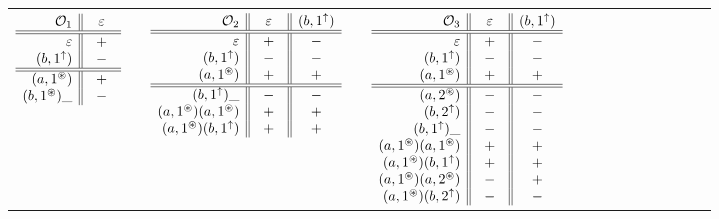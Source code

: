 \documentclass{LMCS}
\newcommand{\rreg}[1]{#1^\uparrow}
\newcommand{\gfresh}[1]{#1^\circledast}
\begin{document}
\begin{figure}[ht]
\begin{center}
{\footnotesize
\noindent
\begin{tabular}{lllllllllllllll}
$
\begin{array}[t]{r||c}
\mathcal O_1& ~~\varepsilon~~ \\\hline\hline
\varepsilon&+\\
(b,\rreg{1})&-\\
\hline\hline
(a,\gfresh{1})&+\\
(b,\gfresh{1})\_ &-\\
\end{array}
$
&\raisebox{-2ex}{$\Rightarrow$}&
$
\begin{array}[t]{r||c||c}
\mathcal O_2&~~ \varepsilon~~ & (b,\rreg{1})\\\hline\hline
\varepsilon&+&-\\
(b,\rreg{1})&-&-\\
(a,\gfresh{1})&+&+\\
\hline\hline
(b,\rreg{1})\_ &-&-\\
(a,\gfresh{1})(a,\gfresh{1})&+&+\\
(a,\gfresh{1})(b,\rreg{1})&+&+\\
\end{array}
$
&\raisebox{-2ex}{$\Rightarrow$}&
$
\begin{array}[t]{r||c||c}
\mathcal O_3& ~~\varepsilon~~ & (b,\rreg{1})\\\hline\hline
\varepsilon&+&-\\
(b,\rreg{1})&-&-\\
(a,\gfresh{1})&+&+\\
\hline\hline
(a,\gfresh{2})&-&-\\
(b,\rreg{2})&-&-\\
(b,\rreg{1})\_ &-&-\\
(a,\gfresh{1})(a,\gfresh{1})&+&+\\
(a,\gfresh{1})(b,\rreg{1})&+&+\\
(a,\gfresh{1})(a,\gfresh{2})&-&+\\
(a,\gfresh{1})(b,\rreg{2})&-&-\\
\end{array}
$
&\raisebox{-2ex}{$\Rightarrow$}&
\end{tabular}

\vspace*{2ex}

}
\end{center}
\end{figure}
\end{document}
